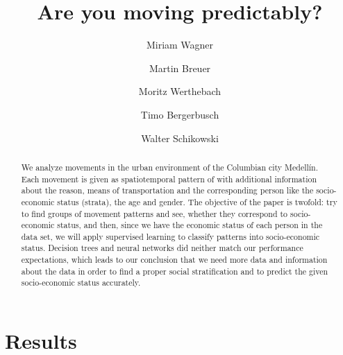 \documentclass[runningheads]{llncs}
\begin{document}
	
	
	\title{Are you moving predictably?}
	\author{Miriam Wagner\and
		Martin Breuer\and
		Moritz Werthebach\and
		Timo Bergerbusch\and
		Walter Schikowski}
	\maketitle              %
	\begin{abstract}
		We analyze movements in the urban environment of the Columbian city Medellín. Each movement is given as spatiotemporal pattern of with additional information about the reason, means of transportation and the corresponding person like the socio-economic status (strata), the age and gender. 
		The objective of the paper is twofold: try to find groups of movement patterns and see, whether they correspond to socio-economic status, and then, since we have the economic status of each person in the data set, we will apply supervised learning to classify patterns into socio-economic status.
		Decision trees and neural networks did neither match our performance expectations, which leads to our conclusion that we need more data and information about the data in order to find a proper social stratification and to predict the given socio-economic status accurately.
		
	\end{abstract}
	
	
	

%	
	
	\section{Results}
		
\end{document}
